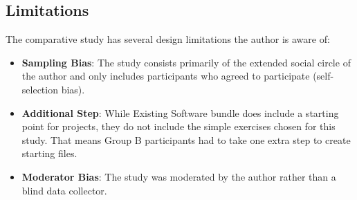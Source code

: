 \subsection{Limitations}

The comparative study has several design limitations the author is aware of:

\begin{itemize}
    \item \textbf{Sampling Bias}: The study consists primarily of the extended social circle of the author and only includes participants who agreed to participate (self-selection bias).
    \item \textbf{Additional Step}: While Existing Software bundle does include a starting point for projects, they do not include the simple exercises chosen for this study. That means Group B participants had to take one extra step to create starting files.
    \item \textbf{Moderator Bias}: The study was moderated by the author rather than a blind data collector.
\end{itemize}
